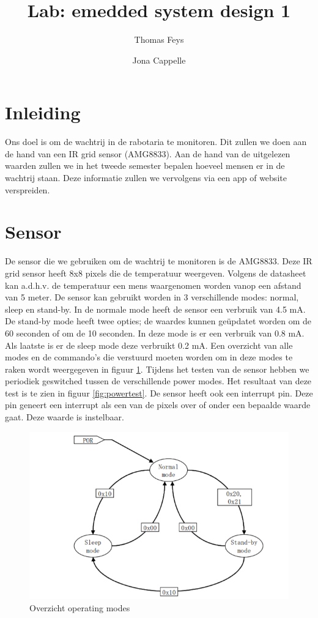 \documentclass[]{article}
\title{Lab: emedded system design 1}
\author{Thomas Feys \and Jona Cappelle}
\begin{document}
\maketitle

\tableofcontents


\section{Inleiding}
Ons doel is om de wachtrij in de rabotaria te monitoren. Dit zullen we doen aan de hand van een IR grid sensor (AMG8833). Aan de hand van de uitgelezen waarden zullen we in het tweede semester bepalen hoeveel mensen er in de wachtrij staan. Deze informatie zullen we vervolgens via een app of website verspreiden. 
\section{Sensor}
De sensor die we gebruiken om de wachtrij te monitoren is de AMG8833. Deze IR grid sensor heeft 8x8 pixels die de temperatuur weergeven. Volgens de datasheet kan a.d.h.v. de temperatuur een mens waargenomen worden vanop een afstand van 5 meter. De sensor kan gebruikt worden in 3 verschillende modes: normal, sleep en stand-by. In de normale mode heeft de sensor een verbruik van 4.5 mA. De stand-by mode heeft twee opties; de waardes kunnen geüpdatet worden om de 60 seconden of om de 10 seconden. In deze mode is er een verbruik van 0.8 mA. Als laatste is er de sleep mode deze verbruikt 0.2 mA. Een overzicht van alle modes en de commando's die verstuurd moeten worden om in deze modes te raken wordt weergegeven in figuur \ref{fig:operatingmodes}. Tijdens het testen van de sensor hebben we periodiek geswitched tussen de verschillende power modes. Het resultaat van deze test is te zien in figuur \ref{fig:powertest}. De sensor heeft ook een interrupt pin. Deze pin geneert een interrupt als een van de pixels over of onder een bepaalde waarde gaat. Deze waarde is instelbaar.	
\begin{figure}[!ht]
	\centering
	\includegraphics{operatingmodes.png}
	\caption{Overzicht operating modes}
	\label{fig:operatingmodes}
\end{figure}
\end{document}
